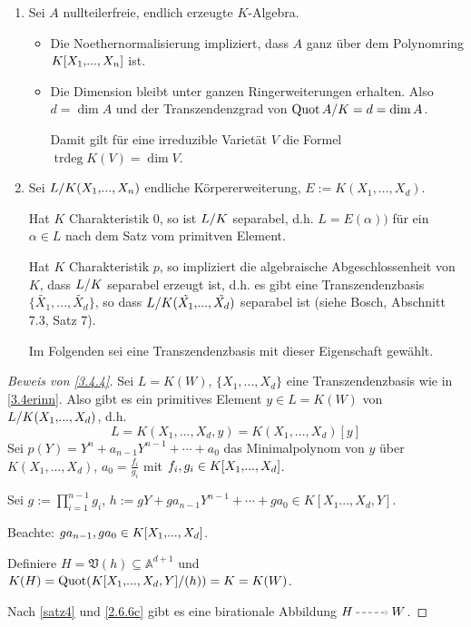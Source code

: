 \documentclass[a4paper,12pt]{scrbook}
\theoremstyle{keinenummern} %
\theoremstyle{mitnummern}
\theoremstyle{unserbeweis}
\newtheorem{proof}{Beweis}
\def\A{\mathbb{A}}
\def\V{\mathfrak{V}}
\newcommand{\trdeg}{\operatorname{trdeg}}
\newcommand{\Quot}{\operatorname{Quot}}
\renewcommand{\dotsc}{\ensuremath{\!...}}
\newcommand{\ppf}{\raisebox{-1pt}{\tikz{\draw[densely dashed,thin,shorten >=3pt, ->] (0,0) node{\hspace*{-2pt}} -- node{} (1,0);}}\penalty1000\relax}
\newcommand{\Quotient}[2]{
  \mathchoice
  { %
    \raisebox{0.7ex}{\ensuremath{#1}}
    \ensuremath{\mkern-3mu}\big/\ensuremath{\mkern-3mu}
    \raisebox{-0.6ex}{\ensuremath{#2}}
  }
  { %
    #1/#2
  }
  { %
    #1/#2
  }
  { %
    #1/#2
  }
}
\newcommand{\polyx}[1][n]{\ensuremath%
  [X_{1},\dotsc,X_{#1}]}
\begin{document}
\begin{nerinnerung} 
\begin{enumerate}
  \item Sei $A$ nullteilerfreie, endlich erzeugte $K$-Algebra.
  \begin{itemize}
       \item Die Noethernormalisierung impliziert, dass $A$ ganz über dem Polynomring $K\polyx$ ist.
       \item Die Dimension bleibt unter ganzen Ringerweiterungen erhalten. Also $d=\dim A$ und der Transzendenzgrad von $\Quotient{\Quot A}{K}=d=\dim A$.
 
       Damit gilt für eine irreduzible Varietät $V$ die Formel $\trdeg K(V)=\dim V$.
  \end{itemize}
   \item\label{3.4erinn} Sei $\Quotient{L}{K(X_1,\dotsc,X_n)}$ endliche Körpererweiterung, $E:=K(X_1,\dotsc,X_d)$.

Hat $K$ Charakteristik $0$, so ist $\Quotient{L}{K}$ separabel, d.h. $L=E(\alpha))$ für ein $\alpha \in L$ nach dem Satz vom primitven Element.

Hat $K$ Charakteristik $p$, so impliziert die algebraische Abgeschlossenheit von $K$, dass $\Quotient{L}{K}$ separabel erzeugt ist, d.h. es gibt eine Transzendenzbasis $\{\tilde{X_1},\dotsc,\tilde{X_d}\}$, so dass $\Quotient{L}{K(\tilde{X_1},\dotsc,\tilde{X_d})}$ separabel ist (siehe Bosch, Abschnitt 7.3, Satz 7).

Im Folgenden sei eine Transzendenzbasis mit dieser Eigenschaft gewählt.

\end{enumerate}
\end{nerinnerung}

\begin{proof}[Beweis von \cref{3.4.4}] Sei $L=K(W)$, $\{X_1,\dotsc,X_d\}$ eine Transzendenzbasis wie in \cref{3.4erinn}. Also gibt es ein primitives Element $y\in L=K(W)$ von $\Quotient{L}{K(X_1,\dotsc,X_d)}$, d.h.
\[L=K(X_1,\dotsc,X_d,y)=K(X_1,\dotsc,X_d)[y]\]
Sei $p(Y)=Y^n+a_{n-1}Y^{n-1}+\dotsm+a_0$ das Minimalpolynom von $y$ über $K(X_1,\dotsc,X_d)$, $a_0=\frac{f_i}{g_i}$ mit $f_i, g_i \in K\polyx[d]$.

Sei $g:=\prod\limits_{i=1}^{n-1} g_i$, $h:=gY+ga_{n-1}Y^{n-1}+\dotsm+ga_0 \in K[X_1\dotsc,X_d,Y]$. 

Beachte: $ga_{n-1}, ga_0 \in K\polyx[d]$.

Definiere $H=\V(h)\subseteq \A^{d+1}$ und $K(H)=\Quot(\Quotient{K[X_1,\dotsc,X_d,Y]}{(h)})=K=K(W)$.

Nach \cref{satz4} und \cref{2.6.6c} gibt es eine birationale Abbildung $H\ppf W$.
\end{proof}
\end{document}
